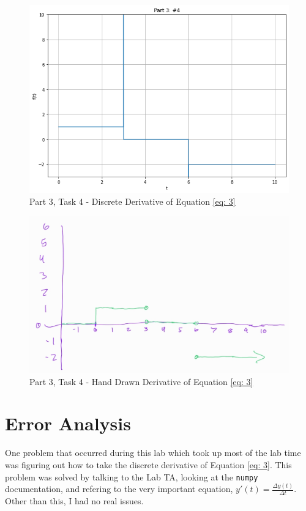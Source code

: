 \documentclass[12pt]{report}
\begin{document}
\begin{figure}[h!]
  \centering
  \includegraphics[scale=0.5]{p3t5.png}
  \caption{Part 3, Task 4 - Discrete Derivative of Equation \eqref{eq: 3}}
  \label{fig: p3t5}
\end{figure}
\begin{figure}[h!]
  \centering
  \includegraphics[scale=0.35]{p3t4.jpg}
  \caption{Part 3, Task 4 - Hand Drawn Derivative of Equation \eqref{eq: 3}}
  \label{fig: p3t4}
\end{figure}
\section{Error Analysis}
One problem that occurred during this lab which took up most of the lab time was figuring out how to take the discrete derivative of Equation \eqref{eq: 3}. This 
problem was solved by talking to the Lab TA, looking at the \texttt{numpy} documentation, and refering to the very important equation, $y'(t) = \frac{\Delta y(t)}{\Delta t}$. 
Other than this, I had no real issues.
\end{document}
